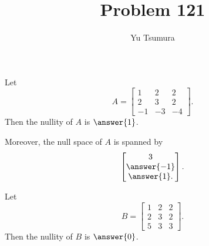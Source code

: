 \documentclass{ximera}
\title{Problem 121}
\author{Yu Tsumura}
\begin{document}
\begin{problem}
  
	 Let
\[A=\begin{bmatrix}
  1 & 2 & 2 \\
   2 &3 &2 \\
   -1 & -3 & -4
 \end{bmatrix}.
\]
Then the nullity of $A$ is $\answer{1}$.
\begin{problem}
Moreover, the null space of $A$ is spanned by
\[
  \begin{bmatrix}
    3 \\
    \answer{-1} \\
    \answer{1}.
  \end{bmatrix}.
\]
\end{problem}
\end{problem}

\begin{problem}
Let
\[
  B=\begin{bmatrix}
    1 & 2 & 2 \\
    2 &3 &2 \\
    5 & 3 & 3
  \end{bmatrix}.
\]
Then the nullity of $B$ is $\answer{0}$.
\end{problem}

	
\end{document}
